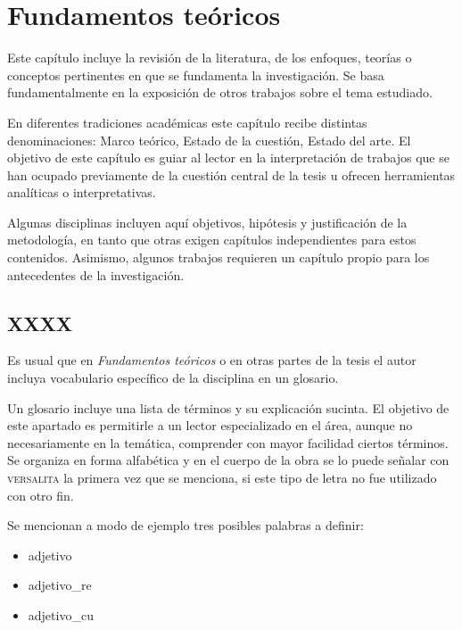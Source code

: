 \chapter{Fundamentos teóricos}

Este capítulo incluye la revisión de la literatura, de los enfoques, teorías o conceptos pertinentes en que se fundamenta la investigación. Se basa fundamentalmente en la exposición de otros trabajos sobre el tema estudiado.

En diferentes tradiciones académicas este capítulo recibe distintas denominaciones: Marco teórico, Estado de la cuestión, Estado del arte. El objetivo de este capítulo es guiar al lector en la interpretación de trabajos que se han ocupado previamente de la cuestión central de la tesis u ofrecen herramientas analíticas o interpretativas. 

Algunas disciplinas incluyen aquí objetivos, hipótesis y justificación de la metodología, en tanto que otras exigen capítulos independientes para estos contenidos. Asimismo, algunos trabajos requieren un capítulo propio para los antecedentes de la investigación.



\section{XXXX}

Es usual que en \textit{Fundamentos teóricos} o en otras partes de la tesis el autor incluya vocabulario específico de la disciplina en un glosario.

Un glosario incluye una lista de términos y su explicación sucinta. El objetivo de este apartado es permitirle a un lector especializado en el área, aunque no necesariamente en la temática, comprender con mayor facilidad ciertos términos. 
Se organiza en forma alfabética y en el cuerpo de la obra se lo puede señalar con \textsc{versalita} la primera vez que se menciona, si este tipo de letra no fue utilizado con otro fin.

Se mencionan a modo de ejemplo tres posibles palabras a definir:
%
\begin{itemize}
\item \gls{adjetivo}
\item \gls{adjetivo_re}
\item \gls{adjetivo_cu}
\end{itemize}

